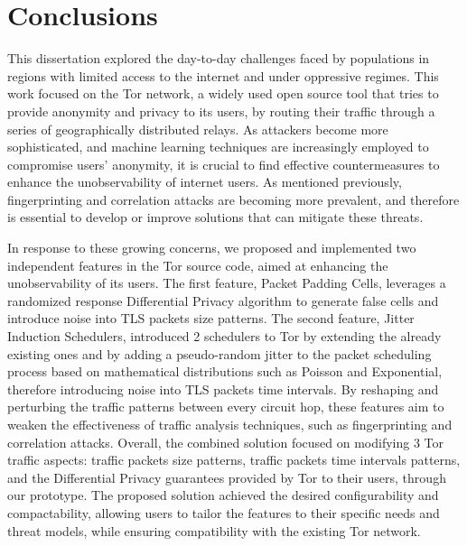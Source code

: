 
%

\chapter{Conclusions}\label{cha:conclusions}

This dissertation explored the day-to-day challenges faced by populations in regions with limited access to the internet and under oppressive regimes. This work focused on the Tor network, a widely used open source tool that tries to provide anonymity and privacy to its users, by routing their traffic through a series of geographically distributed relays. As attackers become more sophisticated, and machine learning techniques are increasingly employed to compromise users' anonymity, it is crucial to find effective countermeasures to enhance the unobservability of internet users. As mentioned previously, fingerprinting and correlation attacks are becoming more prevalent, and therefore is essential to develop or improve solutions that can mitigate these threats.

In response to these growing concerns, we proposed and implemented two independent features in the Tor source code, aimed at enhancing the unobservability of its users. The first feature, Packet Padding Cells, leverages a randomized response Differential Privacy algorithm to generate false cells and introduce noise into TLS packets size patterns. The second feature, Jitter Induction Schedulers, introduced 2 schedulers to Tor by extending the already existing ones and by adding a pseudo-random jitter to the packet scheduling process based on mathematical distributions such as Poisson and Exponential, therefore introducing noise into TLS packets time intervals. By reshaping and perturbing the traffic patterns between every circuit hop, these features aim to weaken the effectiveness of traffic analysis techniques, such as fingerprinting and correlation attacks. Overall, the combined solution focused on modifying 3 Tor traffic aspects: traffic packets size patterns, traffic packets time intervals patterns, and the Differential Privacy guarantees provided by Tor to their users, through our prototype. The proposed solution achieved the desired configurability and compactability, allowing users to tailor the features to their specific needs and threat models, while ensuring compatibility with the existing Tor network.

